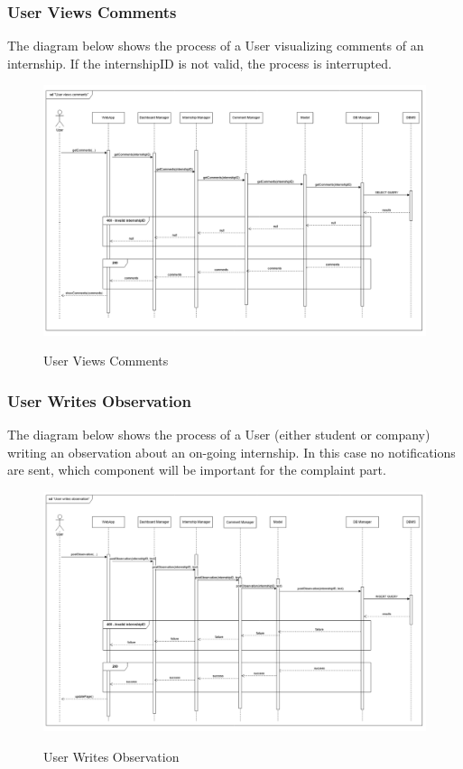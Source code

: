 \documentclass[a4paper,12pt]{article}
\begin{document}
\subsubsection*{User Views Comments}
The diagram below shows the process of a User visualizing comments of an internship. If the internshipID is not valid, the process is interrupted.
\begin{figure}[H]
\centering
\includegraphics[scale = 0.4]{DD_figures/RuntimeView/UserViewsCommentsRV.png}\\
\caption{User Views Comments}
\end{figure}
\newpage

\subsubsection*{User Writes Observation}
The diagram below shows the process of a User (either student or company) writing an observation about an on-going internship. In this case no notifications are sent, which component will be important for the complaint part.
\begin{figure}[H]
\centering
\includegraphics[scale = 0.4]{DD_figures/RuntimeView/UserWritesObservationRV.png}\\
\caption{User Writes Observation}
\end{figure}
\newpage
\end{document}
